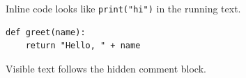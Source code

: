 \documentclass{article}
\begin{document}
Inline code looks like \verb|print("hi")| in the running text.
\begin{verbatim}
def greet(name):
    return "Hello, " + name
\end{verbatim}

Visible text follows the hidden comment block.
\end{document}

